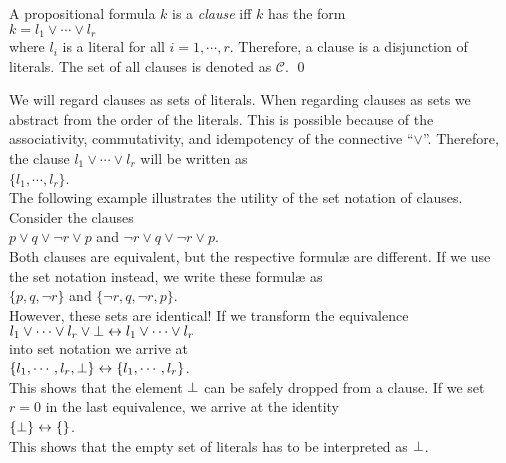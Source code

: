 \begin{Definition}[Clause]
   A propositional formula $k$ is a \emph{clause} iff $k$ has the form \\[0.2cm]
\hspace*{1.3cm} $k = l_1 \vee \cdots \vee l_r$ \\[0.2cm]
where $l_i$ is a literal for all $i=1,\cdots,r$.  Therefore, a clause is a disjunction of literals.
The set of all clauses is denoted as $\mathcal{C}$.
\qed
\end{Definition}

We will regard clauses as sets of literals.  When regarding clauses as sets we abstract
from the order of the literals.  This is possible because of the associativity, commutativity, and
idempotency of the connective  ``$\vee$''.  Therefore, the clause $l_1 \vee \cdots \vee l_r$ will be
written as 
\\[0.2cm]
\hspace*{1.3cm} $\{ l_1, \cdots, l_r \}$.
\\[0.2cm]
The following example illustrates the utility of the set notation of clauses.
Consider the clauses
\\[0.2cm]
\hspace*{1.3cm}
$p \vee q \vee \neg r \vee p$ \quad and \quad $\neg r \vee q \vee \neg r \vee p$. 
\\[0.2cm]
Both clauses are equivalent, but the respective {formul\ae} are different.
If we use the set notation instead, we write these {formul\ae} as
\\[0.2cm]
\hspace*{1.3cm}
$\{p, q, \neg r \}$ \quad and \quad $\{ \neg r, q, \neg r, p \}$. 
\\[0.2cm]
However, these sets are identical!  
If we transform the equivalence
\\[0.2cm]
\hspace*{1.3cm}
$l_1 \vee \cdots \vee l_r \vee \bot \leftrightarrow l_1 \vee \cdots \vee l_r$
\\[0.2cm]
into set notation we arrive at
\\[0.2cm]
\hspace*{1.3cm}
$\{ l_1, \cdots, l_r, \bot \} \leftrightarrow \{ l_1, \cdots, l_r \}$.
\\[0.2cm]
This shows that the element $\bot$ can be safely dropped from a clause.
If we set $r=0$ in the last equivalence, we arrive at the identity
\\[0.2cm]
\hspace*{1.3cm}
$\{\bot \} \leftrightarrow \{\}$.
\\[0.2cm]
This shows that the empty set of literals has to be interpreted as $\bot$.

